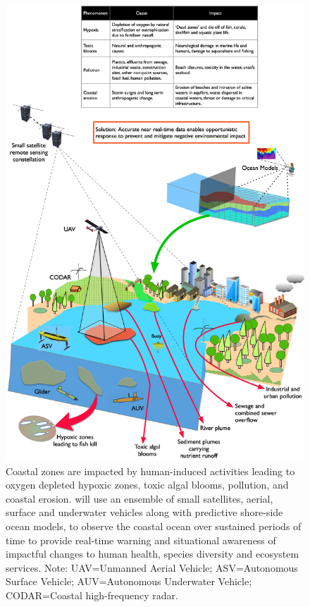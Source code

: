 \else 

\begin{figure}[h!]
  \centering
  \includegraphics[scale=0.122]{fig/mega-cities-toxic-1.jpg}
  \caption{Coastal zones are impacted by human-induced activities
    leading to oxygen depleted hypoxic zones, toxic algal blooms,
    pollution, and coastal erosion. \pro will use an ensemble of small
    satellites, aerial, surface and underwater vehicles along with
    predictive shore-side ocean models, to observe the coastal ocean
    over sustained periods of time to provide real-time warning and
    situational awareness of impactful changes to human health,
    species diversity and ecosystem services. Note: UAV=Unmanned
    Aerial Vehicle; ASV=Autonomous Surface Vehicle; AUV=Autonomous
    Underwater Vehicle; CODAR=Coastal high-frequency radar.}
    \label{fig:mega-cities}
\end{figure}

